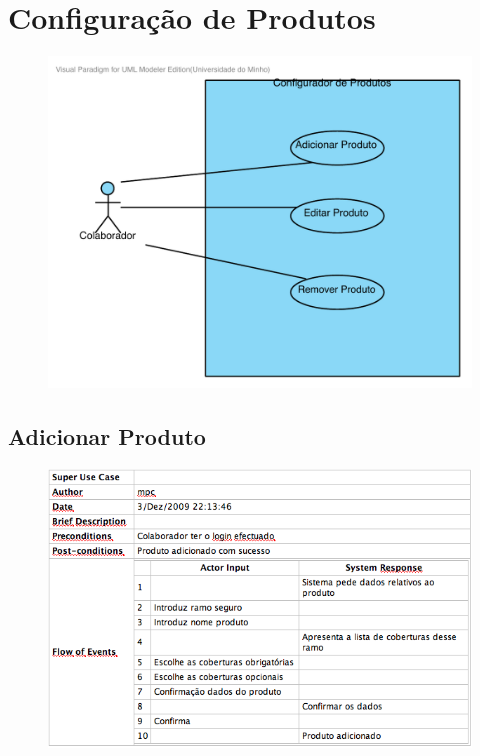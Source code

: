 \section{Configuração de Produtos}
\begin{figure}[!htb]
	\centering
	\includegraphics[scale=0.7]{images/Prints/ConfiguracaoProdutos/Produtos.pdf}
\end{figure}

\pagebreak

\subsection{Adicionar Produto}
\begin{figure}[!htb]
	\centering
	\includegraphics[scale=0.61]{images/Prints/ConfiguracaoProdutos/AdicionarProduto.png}
\end{figure}

